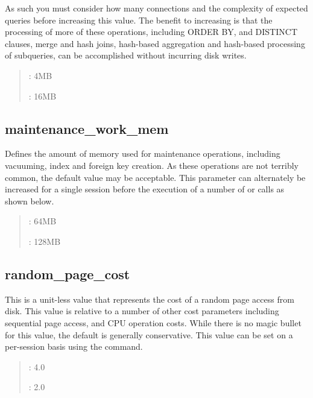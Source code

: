 \documentclass[a4paper,11pt,english]{sphinxmanual}
\begin{document}
As such you must consider how many connections and the complexity of expected queries before increasing this value.  The benefit to increasing is that the processing of more of these operations, including ORDER BY, and DISTINCT clauses, merge and hash joins, hash-based aggregation and hash-based processing of subqueries, can be accomplished without incurring disk writes.
\begin{quote}

: 4MB

: 16MB
\end{quote}

\noindent{}


\subsection{maintenance\_work\_mem}
\label{\detokenize{maintenance:maintenance-work-mem}}
Defines the amount of memory used for maintenance operations, including vacuuming, index and foreign key creation.  As these operations are not terribly common, the default value may be acceptable.  This parameter can alternately be increased for a single session before the execution of a number of  or  calls as shown below.
\begin{quote}

\begin{sphinxVerbatim}[commandchars=\\\{\}]
   
 
   
\end{sphinxVerbatim}

: 64MB

: 128MB
\end{quote}

\noindent{}


\subsection{random\_page\_cost}
\label{\detokenize{maintenance:random-page-cost}}
This is a unit-less value that represents the cost of a random page access from disk.  This value is relative to a number of other cost parameters including sequential page access, and CPU operation costs.  While there is no magic bullet for this value, the default is generally conservative.  This value can be set on a per-session basis using the  command.
\begin{quote}

: 4.0

: 2.0
\end{quote}
\end{document}
